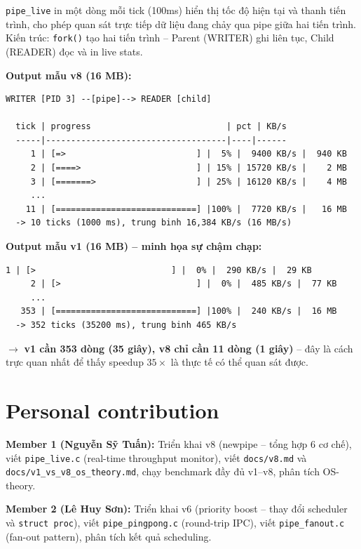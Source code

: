 \documentclass[11pt,a4paper]{article}
\begin{document}
\texttt{pipe\_live} in một dòng mỗi tick (100ms) hiển thị tốc độ hiện tại và thanh tiến trình, cho phép quan sát trực tiếp dữ liệu đang chảy qua pipe giữa hai tiến trình. Kiến trúc: \texttt{fork()} tạo hai tiến trình -- Parent (WRITER) ghi liên tục, Child (READER) đọc và in live stats.

\textbf{Output mẫu v8 (16 MB):}

\begin{lstlisting}[style=plain]
  WRITER [PID 3] --[pipe]--> READER [child]

  tick | progress                           | pct | KB/s
  -----|------------------------------------|----|------
     1 | [=>                          ] |  5% |  9400 KB/s |  940 KB
     2 | [====>                       ] | 15% | 15720 KB/s |    2 MB
     3 | [=======>                    ] | 25% | 16120 KB/s |    4 MB
     ...
    11 | [============================] |100% |  7720 KB/s |   16 MB
  -> 10 ticks (1000 ms), trung binh 16,384 KB/s (16 MB/s)
\end{lstlisting}

\textbf{Output mẫu v1 (16 MB) -- minh họa sự chậm chạp:}

\begin{lstlisting}[style=plain]
     1 | [>                           ] |  0% |  290 KB/s |  29 KB
     2 | [>                           ] |  0% |  485 KB/s |  77 KB
     ...
   353 | [============================] |100% |  240 KB/s |  16 MB
  -> 352 ticks (35200 ms), trung binh 465 KB/s
\end{lstlisting}

$\rightarrow$ \textbf{v1 cần 353 dòng (35 giây), v8 chỉ cần 11 dòng (1 giây)} -- đây là cách trực quan nhất để thấy speedup $35\times$ là thực tế có thể quan sát được.

\section{Personal contribution}

\textbf{Member 1 (Nguyễn Sỹ Tuấn):} Triển khai v8 (newpipe -- tổng hợp 6 cơ chế), viết \texttt{pipe\_live.c} (real-time throughput monitor), viết \texttt{docs/v8.md} và \texttt{docs/v1\_vs\_v8\_os\_theory.md}, chạy benchmark đầy đủ v1--v8, phân tích OS-theory.

\textbf{Member 2 (Lê Huy Sơn):} Triển khai v6 (priority boost -- thay đổi scheduler và \texttt{struct proc}), viết \texttt{pipe\_pingpong.c} (round-trip IPC), viết \texttt{pipe\_fanout.c} (fan-out pattern), phân tích kết quả scheduling.
\end{document}
